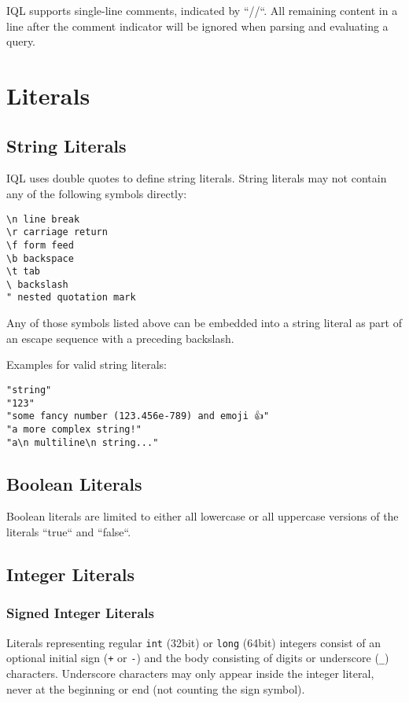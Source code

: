 \documentclass[11pt]{article}
\begin{document}
IQL supports single-line comments, indicated by ``//``. All remaining content in a line after the comment indicator will be ignored when parsing and evaluating a query.

\section{Literals}
\label{sec:literals}

\subsection{String Literals}
\label{sec:string-literals}

IQL uses double quotes to define string literals. String literals may not contain any of the following symbols directly:

\begin{verbatim}
\n line break
\r carriage return
\f form feed
\b backspace
\t tab
\ backslash
" nested quotation mark
\end{verbatim}

Any of those symbols listed above can be embedded into a string literal as part of an escape sequence with a preceding backslash.

Examples for valid string literals:

\begin{verbatim}
"string"
"123"
"some fancy number (123.456e-789) and emoji 👍"
"a more complex string!"
"a\n multiline\n string..."
\end{verbatim}

\subsection{Boolean Literals}
\label{sec:boolean-literals}

Boolean literals are limited to either all lowercase or all uppercase versions of the literals ``true`` and ``false``.

\subsection{Integer Literals}
\label{sec:integer-literals}

\subsubsection{Signed Integer Literals}
Literals representing regular \texttt{int} (32bit) or \texttt{long} (64bit) integers consist of an optional initial sign (\texttt{+} or \texttt{-}) and the body consisting of digits or underscore (\texttt{\_}) characters.
Underscore characters may only appear inside the integer literal, never at the beginning or end (not counting the sign symbol).
\end{document}
